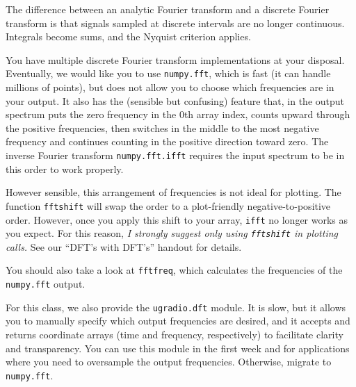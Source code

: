 \documentclass[11pt,preprint]{aastex}
\begin{document}
\noindent
The difference between an analytic Fourier transform and a discrete Fourier transform is
that signals sampled at discrete intervals are no longer continuous. 
Integrals become sums, and the Nyquist criterion applies.

You have multiple discrete Fourier transform implementations at your disposal.  Eventually, we would like you
to use \verb$numpy.fft$, which is fast (it can handle millions of points), but does not allow you to choose
which frequencies are in your output. It also has the (sensible but confusing) feature that, in the output
spectrum puts the zero frequency in the 0th array index, counts upward through the positive frequencies, then
switches in the middle to the most negative frequency and continues counting in the positive direction
toward zero.  The inverse Fourier transform \verb$numpy.fft.ifft$ requires the input spectrum to be in this
order to work properly.

However sensible, this arrangement of frequencies is not ideal for plotting. The function \verb$fftshift$
will swap the order to a plot-friendly negative-to-positive order. However, once you apply this shift to
your array, \verb$ifft$ no longer works as you expect.  For this reason, {\it I strongly suggest only using 
\verb$fftshift$ in plotting calls.}
See our ``DFT's with DFT's'' handout for details.

You should also take a look at \verb$fftfreq$, which calculates the frequencies of the \verb$numpy.fft$ output.

For this class, we also provide the \verb$ugradio.dft$ module.  It is slow, but it allows you to manually specify
which output frequencies are desired, and it accepts and returns coordinate arrays (time and frequency, respectively)
to facilitate clarity and transparency. You can use this module in the first week and for applications where
you need to oversample the output frequencies. Otherwise, migrate to \verb$numpy.fft$.
\end{document}
